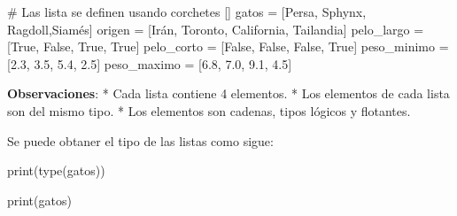 \documentclass[
  letterpaper,
  DIV=11,
  numbers=noendperiod]{scrreprt}
\newenvironment{Shaded}{\begin{snugshade}}{\end{snugshade}}
\newcommand{\BuiltInTok}[1]{\textcolor[rgb]{0.00,0.23,0.31}{#1}}
\newcommand{\CommentTok}[1]{\textcolor[rgb]{0.37,0.37,0.37}{#1}}
\newcommand{\FloatTok}[1]{\textcolor[rgb]{0.68,0.00,0.00}{#1}}
\newcommand{\NormalTok}[1]{\textcolor[rgb]{0.00,0.23,0.31}{#1}}
\newcommand{\OperatorTok}[1]{\textcolor[rgb]{0.37,0.37,0.37}{#1}}
\newcommand{\StringTok}[1]{\textcolor[rgb]{0.13,0.47,0.30}{#1}}
\newcommand{\VariableTok}[1]{\textcolor[rgb]{0.07,0.07,0.07}{#1}}
\begin{document}
\begin{Shaded}
\begin{Highlighting}[]
\CommentTok{\# Las lista se definen usando corchetes []}
\NormalTok{gatos }\OperatorTok{=}\NormalTok{ [}\StringTok{\textquotesingle{}Persa\textquotesingle{}}\NormalTok{, }\StringTok{\textquotesingle{}Sphynx\textquotesingle{}}\NormalTok{, }\StringTok{\textquotesingle{}Ragdoll\textquotesingle{}}\NormalTok{,}\StringTok{\textquotesingle{}Siamés\textquotesingle{}}\NormalTok{]}
\NormalTok{origen }\OperatorTok{=}\NormalTok{ [}\StringTok{\textquotesingle{}Irán\textquotesingle{}}\NormalTok{, }\StringTok{\textquotesingle{}Toronto\textquotesingle{}}\NormalTok{, }\StringTok{\textquotesingle{}California\textquotesingle{}}\NormalTok{, }\StringTok{\textquotesingle{}Tailandia\textquotesingle{}}\NormalTok{]}
\NormalTok{pelo\_largo }\OperatorTok{=}\NormalTok{ [}\VariableTok{True}\NormalTok{, }\VariableTok{False}\NormalTok{, }\VariableTok{True}\NormalTok{, }\VariableTok{True}\NormalTok{]}
\NormalTok{pelo\_corto }\OperatorTok{=}\NormalTok{ [}\VariableTok{False}\NormalTok{, }\VariableTok{False}\NormalTok{, }\VariableTok{False}\NormalTok{, }\VariableTok{True}\NormalTok{]}
\NormalTok{peso\_minimo }\OperatorTok{=}\NormalTok{ [}\FloatTok{2.3}\NormalTok{, }\FloatTok{3.5}\NormalTok{, }\FloatTok{5.4}\NormalTok{, }\FloatTok{2.5}\NormalTok{]}
\NormalTok{peso\_maximo }\OperatorTok{=}\NormalTok{ [}\FloatTok{6.8}\NormalTok{, }\FloatTok{7.0}\NormalTok{, }\FloatTok{9.1}\NormalTok{, }\FloatTok{4.5}\NormalTok{]}
\end{Highlighting}
\end{Shaded}

\textbf{Observaciones}: * Cada lista contiene 4 elementos. * Los
elementos de cada lista son del mismo tipo. * Los elementos son cadenas,
tipos lógicos y flotantes.

Se puede obtaner el tipo de las listas como sigue:

\begin{Shaded}
\begin{Highlighting}[]
\BuiltInTok{print}\NormalTok{(}\BuiltInTok{type}\NormalTok{(gatos))}
\end{Highlighting}
\end{Shaded}

\begin{Shaded}
\begin{Highlighting}[]
\BuiltInTok{print}\NormalTok{(gatos)}
\end{Highlighting}
\end{Shaded}
\end{document}
